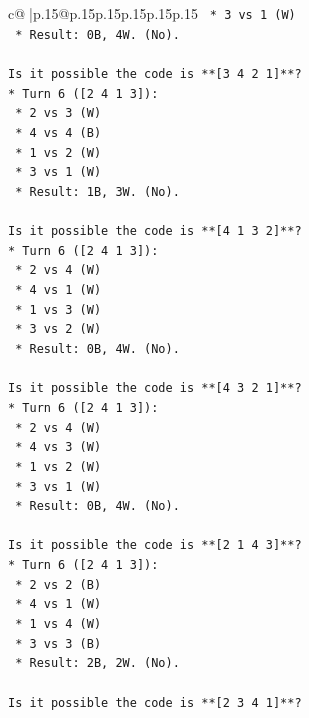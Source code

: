 \documentclass{article}
\begin{document}
{\begin{supertabular}{c@{$\;$}|p{.15\linewidth}@{}p{.15\linewidth}p{.15\linewidth}p{.15\linewidth}p{.15\linewidth}p{.15\linewidth}}
{{{\texttt{    *   3 vs 1 (W)} \\
\texttt{    *   Result: 0B, 4W. (No).} \\
\\ 
\texttt{Is it possible the code is **{[}3 4 2 1{]}**?} \\
\texttt{*   Turn 6 ({[}2 4 1 3{]}):} \\
\texttt{    *   2 vs 3 (W)} \\
\texttt{    *   4 vs 4 (B)} \\
\texttt{    *   1 vs 2 (W)} \\
\texttt{    *   3 vs 1 (W)} \\
\texttt{    *   Result: 1B, 3W. (No).} \\
\\ 
\texttt{Is it possible the code is **{[}4 1 3 2{]}**?} \\
\texttt{*   Turn 6 ({[}2 4 1 3{]}):} \\
\texttt{    *   2 vs 4 (W)} \\
\texttt{    *   4 vs 1 (W)} \\
\texttt{    *   1 vs 3 (W)} \\
\texttt{    *   3 vs 2 (W)} \\
\texttt{    *   Result: 0B, 4W. (No).} \\
\\ 
\texttt{Is it possible the code is **{[}4 3 2 1{]}**?} \\
\texttt{*   Turn 6 ({[}2 4 1 3{]}):} \\
\texttt{    *   2 vs 4 (W)} \\
\texttt{    *   4 vs 3 (W)} \\
\texttt{    *   1 vs 2 (W)} \\
\texttt{    *   3 vs 1 (W)} \\
\texttt{    *   Result: 0B, 4W. (No).} \\
\\ 
\texttt{Is it possible the code is **{[}2 1 4 3{]}**?} \\
\texttt{*   Turn 6 ({[}2 4 1 3{]}):} \\
\texttt{    *   2 vs 2 (B)} \\
\texttt{    *   4 vs 1 (W)} \\
\texttt{    *   1 vs 4 (W)} \\
\texttt{    *   3 vs 3 (B)} \\
\texttt{    *   Result: 2B, 2W. (No).} \\
\\ 
\texttt{Is it possible the code is **{[}2 3 4 1{]}**?} \\
}}}
\end{supertabular}}
\end{document}
